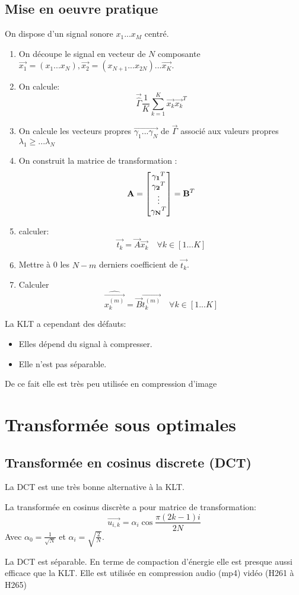 \documentclass[main.tex]{subfiles}
\begin{document}
\subsection{Mise en oeuvre pratique}
On dispose d'un signal sonore $ x_1 ... x_M$ centré.
\begin{enumerate}
\item On découpe le signal en vecteur de $N$ composante $\vec{x_1} = (x_1 ... x_N),\vec{x_2} = (x_{N+1} ... x_{2N}) ... \vec{x_K}$.
\item On calcule:
  \[
    \vec{\hat{\Gamma}}\frac{1}{K}\sum_{k=1}^{K}\vec{x_k}\vec{x_k}^T
  \]
\item On calcule les vecteurs propres $\vec{\gamma_1 ... \gamma_N}$ de $\vec{\Gamma}$ associé aux valeurs propres $\lambda_1 \ge ... \lambda_N$
\item On construit la matrice de transformation :
  \[
    \mathbf{A} =\begin{bmatrix} \mathbf{\gamma_1}^T\\ \mathbf{\gamma_2}^T\\ \vdots \\ \mathbf{\gamma_N}^T \end{bmatrix} = \mathbf{B}^T
  \]
\item calculer:
  \[
    \vec{t_k} = \vec{A}\vec{x_k} \quad \forall k \in [1... K]
  \]
\item Mettre à 0 les $N-m$ derniers coefficient de $\vec{t_k}$.
\item Calculer
  \[
    \hat{\vec{x_k^{(m)}}} =\vec{B} \vec{t_k^{(m)}} \quad \forall k \in [1... K]
  \]

\end{enumerate}

\begin{rem}
  La KLT a cependant des défauts:
  \begin{itemize}
  \item Elles dépend du signal à compresser.
  \item Elle n'est pas séparable.
  \end{itemize}
  De ce fait elle est très peu utilisée en compression d'image
\end{rem}
\section{Transformée sous optimales}
\subsection{Transformée en cosinus discrete (DCT)}
La DCT est une très bonne alternative à la KLT.
\begin{defin}
  La transformée en cosinus discrète a pour matrice de transformation:
  \[
    \vec{u_{i,k}} =\alpha_i \cos \frac{\pi(2k-1)i}{2N}
  \]
  Avec $\alpha_0 =\frac{1}{\sqrt{N}}$ et $\alpha_i  = \sqrt{\frac{2}{N}}$.
\end{defin}
\begin{rem}
  La DCT est séparable.
  En terme de compaction d'énergie elle est presque aussi efficace que la KLT. Elle est utilisée en compression audio (mp4) vidéo (H261 à H265)
\end{rem}
\end{document}
